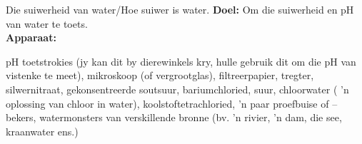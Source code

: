             \begin{g_experiment}{Die suiwerheid van water/Hoe suiwer is water.}
            \nopagebreak
            \label{m38138*id08341}\noindent{}\textbf{Doel:}\newline
Om die suiwerheid en pH van water te toets.
\\
\label{m38138*id083244}\noindent{}\textbf{Apparaat:}\\
\begin{minipage}{.5\textwidth}
pH toetstrokies (jy kan dit by dierewinkels kry, hulle gebruik dit om die pH van vistenke te meet), mikroskoop (of vergrootglas), filtreerpapier, tregter, silwernitraat, gekonsentreerde soutsuur, bariumchloried, suur, chloorwater ( 'n oplossing van chloor in water), koolstoftetrachloried,  'n paar proefbuise of –bekers, watermonsters van verskillende bronne (bv.  'n rivier,  'n dam, die see, kraanwater ens.)
\end{minipage}
\begin{minipage}{.5\textwidth}


\end{minipage}
\end{g_experiment}
